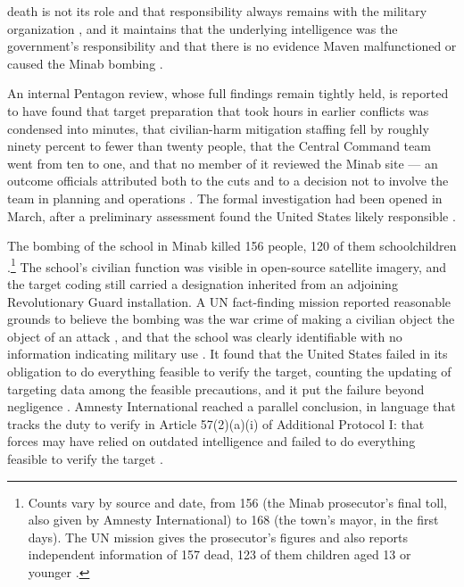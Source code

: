 death is not its role and that responsibility always remains with the military organization \autocite{lee2026palantir}, and it maintains that the underlying intelligence was the government's responsibility and that there is no evidence Maven malfunctioned or caused the Minab bombing \autocite{Bloomberg2026KillChain}.

An internal Pentagon review, whose full findings remain tightly held, is reported to have found that target preparation that took hours in earlier conflicts was condensed into minutes, that civilian-harm mitigation staffing fell by roughly ninety percent to fewer than twenty people, that the Central Command team went from ten to one, and that no member of it reviewed the Minab site — an outcome officials attributed both to the cuts and to a decision not to involve the team in planning and operations \autocite{Bloomberg2026KillChain}. The formal investigation had been opened in March, after a preliminary assessment found the United States likely responsible \autocite{NPR2026MinabProbe}.

The bombing of the school in Minab killed 156 people, 120 of them schoolchildren \autocite[para.~92]{UNFFMIran2026}.\footnote{Counts vary by source and date, from 156 (the Minab prosecutor's final toll, also given by Amnesty International) to 168 (the town's mayor, in the first days). The UN mission gives the prosecutor's figures and also reports independent information of 157 dead, 123 of them children aged 13 or younger \autocite[paras.~92–93]{UNFFMIran2026}.} The school's civilian function was visible in open-source satellite imagery, and the target coding still carried a designation inherited from an adjoining Revolutionary Guard installation. A UN fact-finding mission reported reasonable grounds to believe the bombing was the war crime of making a civilian object the object of an attack \autocite{ohchr2026minabpress}, and that the school was clearly identifiable with no information indicating military use \autocite[paras.~81–86, 124–126]{UNFFMIran2026}. It found that the United States failed in its obligation to do everything feasible to verify the target, counting the updating of targeting data among the feasible precautions, and it put the failure beyond negligence \autocite[paras.~124–125]{UNFFMIran2026}. Amnesty International reached a parallel conclusion, in language that tracks the duty to verify in Article 57(2)(a)(i) of Additional Protocol I: that forces may have relied on outdated intelligence and failed to do everything feasible to verify the target \autocite{Amnesty2026Minab}.

